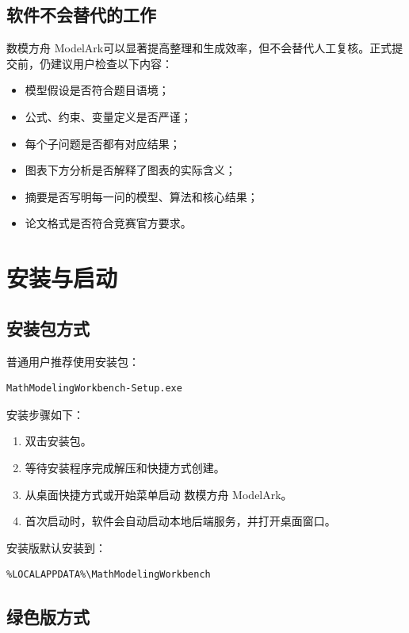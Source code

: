 \documentclass[UTF8,a4paper,12pt]{ctexart}
\newcommand{\app}{数模方舟 ModelArk}
\begin{document}
\subsection{软件不会替代的工作}

\app 可以显著提高整理和生成效率，但不会替代人工复核。正式提交前，仍建议用户检查以下内容：

\begin{itemize}
  \item 模型假设是否符合题目语境；
  \item 公式、约束、变量定义是否严谨；
  \item 每个子问题是否都有对应结果；
  \item 图表下方分析是否解释了图表的实际含义；
  \item 摘要是否写明每一问的模型、算法和核心结果；
  \item 论文格式是否符合竞赛官方要求。
\end{itemize}

\section{安装与启动}

\subsection{安装包方式}

普通用户推荐使用安装包：

\begin{verbatim}
MathModelingWorkbench-Setup.exe
\end{verbatim}

安装步骤如下：

\begin{enumerate}
  \item 双击安装包。
  \item 等待安装程序完成解压和快捷方式创建。
  \item 从桌面快捷方式或开始菜单启动 \app。
  \item 首次启动时，软件会自动启动本地后端服务，并打开桌面窗口。
\end{enumerate}

安装版默认安装到：

\begin{verbatim}
%LOCALAPPDATA%\MathModelingWorkbench
\end{verbatim}

\subsection{绿色版方式}
\end{document}
